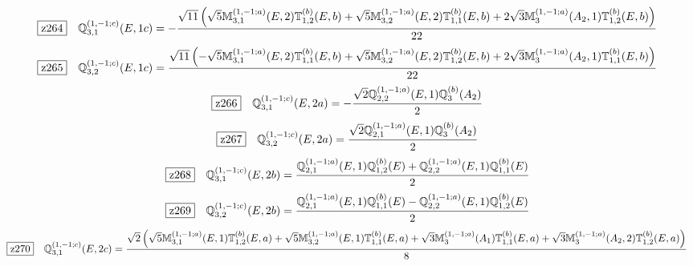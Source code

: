 \documentclass[fleqn,10pt,landscape]{jsarticle}
\begin{document}
\begin{dmath*}
\hspace*{3mm}\fbox{z264}\quad \mathbb{Q}_{3,1}^{(1,-1;c)}(E,1c)=- \frac{\sqrt{11} \left(\sqrt{5} \mathbb{M}_{3,1}^{(1,-1;a)}(E,2) \mathbb{T}_{1,2}^{(b)}(E,b) + \sqrt{5} \mathbb{M}_{3,2}^{(1,-1;a)}(E,2) \mathbb{T}_{1,1}^{(b)}(E,b) + 2 \sqrt{3} \mathbb{M}_{3}^{(1,-1;a)}(A_{2},1) \mathbb{T}_{1,2}^{(b)}(E,b)\right)}{22}
\end{dmath*}
\begin{dmath*}
\hspace*{3mm}\fbox{z265}\quad \mathbb{Q}_{3,2}^{(1,-1;c)}(E,1c)=\frac{\sqrt{11} \left(- \sqrt{5} \mathbb{M}_{3,1}^{(1,-1;a)}(E,2) \mathbb{T}_{1,1}^{(b)}(E,b) + \sqrt{5} \mathbb{M}_{3,2}^{(1,-1;a)}(E,2) \mathbb{T}_{1,2}^{(b)}(E,b) + 2 \sqrt{3} \mathbb{M}_{3}^{(1,-1;a)}(A_{2},1) \mathbb{T}_{1,1}^{(b)}(E,b)\right)}{22}
\end{dmath*}
\begin{dmath*}
\hspace*{3mm}\fbox{z266}\quad \mathbb{Q}_{3,1}^{(1,-1;c)}(E,2a)=- \frac{\sqrt{2} \mathbb{Q}_{2,2}^{(1,-1;a)}(E,1) \mathbb{Q}_{3}^{(b)}(A_{2})}{2}
\end{dmath*}
\begin{dmath*}
\hspace*{3mm}\fbox{z267}\quad \mathbb{Q}_{3,2}^{(1,-1;c)}(E,2a)=\frac{\sqrt{2} \mathbb{Q}_{2,1}^{(1,-1;a)}(E,1) \mathbb{Q}_{3}^{(b)}(A_{2})}{2}
\end{dmath*}
\begin{dmath*}
\hspace*{3mm}\fbox{z268}\quad \mathbb{Q}_{3,1}^{(1,-1;c)}(E,2b)=\frac{\mathbb{Q}_{2,1}^{(1,-1;a)}(E,1) \mathbb{Q}_{1,2}^{(b)}(E) + \mathbb{Q}_{2,2}^{(1,-1;a)}(E,1) \mathbb{Q}_{1,1}^{(b)}(E)}{2}
\end{dmath*}
\begin{dmath*}
\hspace*{3mm}\fbox{z269}\quad \mathbb{Q}_{3,2}^{(1,-1;c)}(E,2b)=\frac{\mathbb{Q}_{2,1}^{(1,-1;a)}(E,1) \mathbb{Q}_{1,1}^{(b)}(E) - \mathbb{Q}_{2,2}^{(1,-1;a)}(E,1) \mathbb{Q}_{1,2}^{(b)}(E)}{2}
\end{dmath*}
\begin{dmath*}
\hspace*{3mm}\fbox{z270}\quad \mathbb{Q}_{3,1}^{(1,-1;c)}(E,2c)=\frac{\sqrt{2} \left(\sqrt{5} \mathbb{M}_{3,1}^{(1,-1;a)}(E,1) \mathbb{T}_{1,2}^{(b)}(E,a) + \sqrt{5} \mathbb{M}_{3,2}^{(1,-1;a)}(E,1) \mathbb{T}_{1,1}^{(b)}(E,a) + \sqrt{3} \mathbb{M}_{3}^{(1,-1;a)}(A_{1}) \mathbb{T}_{1,1}^{(b)}(E,a) + \sqrt{3} \mathbb{M}_{3}^{(1,-1;a)}(A_{2},2) \mathbb{T}_{1,2}^{(b)}(E,a)\right)}{8}
\end{dmath*}
\end{document}
